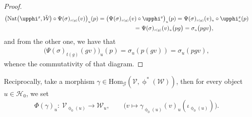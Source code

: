 \documentclass[10pt,a4paper]{amsart}
\numberwithin{equation}{section}
\renewcommand{\hom}[3]{\mathrm{Hom}_{\Sscript{#1}}\left(#2, #3\right)}
\newcommand{\Ho}{\cH_{\Sscript{0}}}
\newcommand{\Wu}{\cW_{\Sscript{u}}}
\newcommand{\cG}{{\mathcal G}}
\newcommand{\cH}{{\mathcal H}}
\newcommand{\cV}{{\mathcal V}}
\newcommand{\cW}{{\mathcal W}}
\newcommand{\Sscript}[1]{\scriptscriptstyle{#1}}
\begin{document}
\begin{proof}
\begin{gather*}
\big( {\rm Nat}\big(\upphi^{\Sscript{g}}, \tilde{\cW}\big) \circ \Psi(\sigma)_{\Sscript{s(g)}}(v) \big)_{\Sscript{u}}(p) = \big(\Psi(\sigma)_{\Sscript{s(g)}}(v) \circ \upphi^{\Sscript{g}}\big)_{\Sscript{u}}(p) =\Psi(\sigma)_{\Sscript{s(g)}}(v)_{\Sscript{u}} \circ
\upphi^{\Sscript{g}}_{\Sscript{u}}(p) \\
\hphantom{\big( {\rm Nat}\big(\upphi^{\Sscript{g}}, \tilde{\cW}\big) \circ \Psi(\sigma)_{\Sscript{s(g)}}(v) \big)_{\Sscript{u}}(p)}{} = \Psi(\sigma)_{\Sscript{s(g)}}(v)_{\Sscript{u}} \big(pg\big) =
\sigma_{\Sscript{u}} \big(pg v\big),
\end{gather*}
and from the other one, we have that
\begin{gather*}
\big( \Psi(\sigma)_{\Sscript{t(g)}}(gv)\big)_{\Sscript{u}}(p) = \sigma_{\Sscript{u}}(p(gv)) = \sigma_{\Sscript{u}}(pgv),
\end{gather*}
whence the commutativity of that diagram.
\end{proof}

Reciprocally, take a morphism $\gamma \in \hom{\cG}{\cV}{\upphi^*(\cW)}$, then for every object $u \in\Ho$,
we set
\begin{gather*}
\Phi(\gamma)_{\Sscript{u}}\colon \ \cV_{\Sscript{\upphi_{0}(u)}} \longrightarrow \Wu, \qquad \big( v \longmapsto \gamma_{\Sscript{\upphi_{0}(u)}}(v)_{\Sscript{u}}(\iota_{\Sscript{\upphi_{0}(u)}})\big).
\end{gather*}
\end{document}
